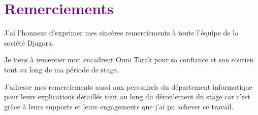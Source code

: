 \chapter*{\centering \textcolor{purple}{Remerciements}}
\thispagestyle{MyStyle}
J’ai l’honneur d’exprimer mes sincères remerciements à toute l’équipe de la société Djagora.\par

Je tiens à remercier mon encadrent Ouni Tarak pour sa confiance et son soutien tout au long de ma période de stage.\par

J’adresse mes remerciements aussi aux personnels du département informatique pour leurs explications détaillés tout au long du déroulement du stage car c’est grâce à leurs supports et leurs engagements que j’ai pu achever ce travail.\par